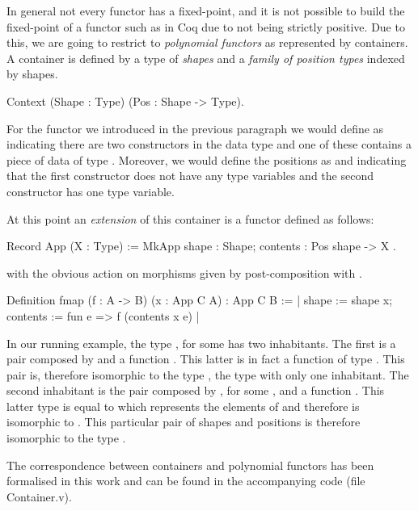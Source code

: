 \documentclass[ a4paper, UKenglish, cleveref, autoref, thm-restate]{lipics-v2021}
\begin{document}
In general not every functor has a fixed-point, and it is not possible to build
the fixed-point of a functor such as  in Coq due to not being strictly
positive.  Due to this, we are going to restrict to \emph{polynomial functors}
as represented by containers. A container is defined by a type of \emph{shapes}
and a \emph{family of position types} indexed by shapes.
\begin{coqcode}
Context (Shape : Type) (Pos : Shape -> Type).
\end{coqcode}
For the functor  we introduced in the previous paragraph we would
define  as  indicating there are two constructors in
the data type and one of these contains a piece of data of type .
Moreover, we would define the positions as 
and   indicating that the first constructor does not
have any type variables and the second constructor has one type variable.

At this point an \emph{extension} of this container is a functor defined as
follows:
\begin{coqcode}
Record App (X : Type) := MkApp { shape : Shape; contents : Pos shape -> X }.
\end{coqcode}
with the obvious action on morphisms given by post-composition
with .
\begin{coqcode}
Definition fmap (f : A -> B) (x : App C A) : App C B
  := {| shape := shape x; contents := fun e => f (contents x e) |}
\end{coqcode}
In our running example, the type , for some  has two
inhabitants.  The first is a pair composed by  and a
function . This latter is in fact a function of
type . This pair is, therefore isomorphic to the
type , the type with only one inhabitant.  The second inhabitant is
the pair composed by , for some , and a
function .  This latter type is equal to 
which represents the elements of  and therefore is isomorphic to .
This particular pair of shapes and positions is  therefore isomorphic to the
type .

The correspondence between containers and polynomial functors has been
formalised in this work and can be found in the accompanying code (file
Container.v). 
% 
\end{document}

